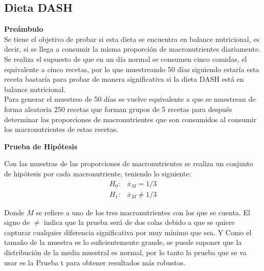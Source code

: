 \documentclass[12pt,a4paper]{article}
\begin{document}
    \subsection{Dieta DASH}
        \textbf{Preámbulo}\\
        { 
            Se tiene el objetivo de probar si esta dieta se encuentra 
            en balance nutricional, es decir, si se llega a consumir la 
            misma proporción de macronutrientes diariamente.\\

            Se realiza el supuesto de que en un día normal se consumen 
            cinco comidas, el equivalente a cinco recetas, por lo que 
            muestreando 50 días siguiendo estaría esta receta bastaría 
            para probar de manera significativa si la dieta DASH está en 
            balance nutricional.\\

            Para generar el muestreo de 50 días se vuelve equivalente a 
            que se muestrean de forma aleatoria 250 recetas que forman 
            grupos de 5 recetas para después determinar las proporciones 
            de macronutrientes que son consumidos al consumir los macronutrientes 
            de estas recetas.\\
        }

        \textbf{Prueba de Hipótesis}\\ 
        {
            Con las muestras de las proporciones de macronutrientes se realiza 
            un conjunto de hipótesis por cada macronutriente, teniendo lo 
            siguiente:
            \begin{align*}
                H_0 :& \overline{x}_M = 1/3  \\
                H_1 :& \overline{x}_M \ne 1/3 
            \end{align*}
        
            Donde $M$ se refiere a uno de los tres macronutrientes con los que 
            se cuenta. El signo de $\ne$ indica que la prueba será de dos colas 
            debido a que se quiere capturar cualquier diferencia significativa 
            por muy mínimo que sea. Y Como el tamaño de la muestra es lo suficientemente 
            grande, se puede suponer que la distribución de la media muestral es 
            normal, por lo tanto la prueba que se va usar es la Prueba t para obtener 
            resultados más robustos.\\
        }
\end{document}

